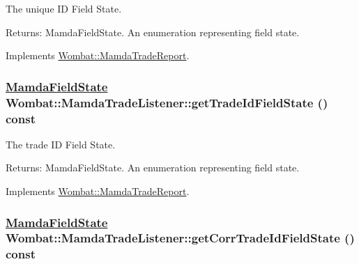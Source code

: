 The unique ID Field State. 

\begin{Desc}
\item[Returns:]Mamda\-Field\-State. An enumeration representing field state. \end{Desc}


Implements \hyperlink{classWombat_1_1MamdaTradeReport_32722ba8f872d14f9790fd3869b17640}{Wombat::Mamda\-Trade\-Report}.\hypertarget{classWombat_1_1MamdaTradeListener_2475e2a2f9dd0cbd3425b64f84beb258}{
\subsubsection[getTradeIdFieldState]{\setlength{\rightskip}{0pt plus 5cm}\hyperlink{namespaceWombat_93aac974f2ab713554fd12a1fa3b7d2a}{Mamda\-Field\-State} Wombat::Mamda\-Trade\-Listener::get\-Trade\-Id\-Field\-State () const}}
\label{classWombat_1_1MamdaTradeListener_2475e2a2f9dd0cbd3425b64f84beb258}


The trade ID Field State. 

\begin{Desc}
\item[Returns:]Mamda\-Field\-State. An enumeration representing field state. \end{Desc}


Implements \hyperlink{classWombat_1_1MamdaTradeReport_9ff0c7bf7e478588bb42718123fc62ca}{Wombat::Mamda\-Trade\-Report}.\hypertarget{classWombat_1_1MamdaTradeListener_8598485802bcf8f1290f36ecfa964d99}{
\subsubsection[getCorrTradeIdFieldState]{\setlength{\rightskip}{0pt plus 5cm}\hyperlink{namespaceWombat_93aac974f2ab713554fd12a1fa3b7d2a}{Mamda\-Field\-State} Wombat::Mamda\-Trade\-Listener::get\-Corr\-Trade\-Id\-Field\-State () const}}
\label{classWombat_1_1MamdaTradeListener_8598485802bcf8f1290f36ecfa964d99}


